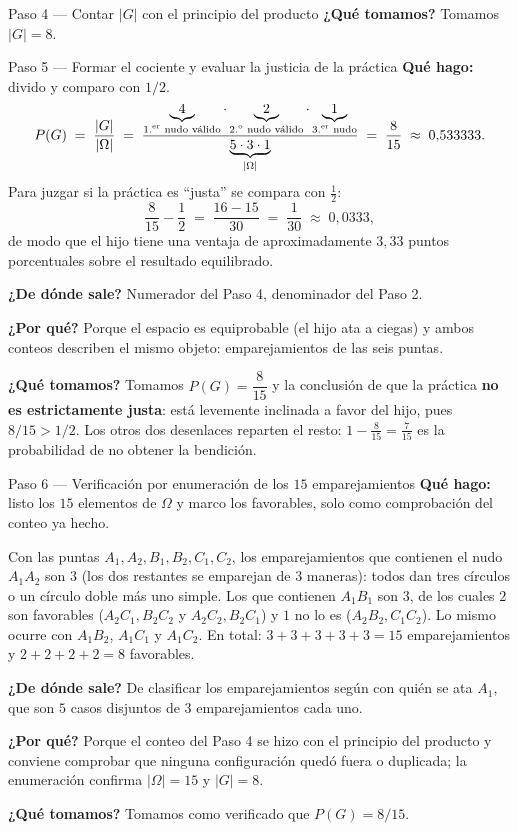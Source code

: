 \documentclass[11pt]{article}
\begin{document}
\begin{sol}
\begin{paso}{Paso 4 --- Contar $|G|$ con el principio del producto}
\textbf{¿Qu\'e tomamos?} Tomamos $|G|=8$.
\end{paso}

\begin{paso}{Paso 5 --- Formar el cociente y evaluar la justicia de la pr\'actica}
\textbf{Qu\'e hago:} divido y comparo con $1/2$.
\[
P(G)\;=\;\frac{|G|}{|\Omega|}
\;=\;\frac{\underbrace{4}_{\text{1.\textsuperscript{er} nudo v\'alido}}\cdot\underbrace{2}_{\text{2.\textsuperscript{o} nudo v\'alido}}\cdot\underbrace{1}_{\text{3.\textsuperscript{er} nudo}}}{\underbrace{5\cdot 3\cdot 1}_{|\Omega|}}
\;=\;\frac{8}{15}\;\approx\;0{,}533333 .
\]
Para juzgar si la pr\'actica es ``justa'' se compara con $\tfrac12$:
\[
\frac{8}{15}-\frac{1}{2}\;=\;\frac{16-15}{30}\;=\;\frac{1}{30}\;\approx\;0{,}0333 ,
\]
de modo que el hijo tiene una ventaja de aproximadamente $3{,}33$ puntos porcentuales sobre el resultado equilibrado.

\textbf{¿De d\'onde sale?} Numerador del Paso 4, denominador del Paso 2.

\textbf{¿Por qu\'e?} Porque el espacio es equiprobable (el hijo ata a ciegas) y ambos conteos describen el mismo objeto: emparejamientos de las seis puntas.

\textbf{¿Qu\'e tomamos?} Tomamos $P(G)=\dfrac{8}{15}$ y la conclusi\'on de que la pr\'actica \textbf{no es estrictamente justa}: est\'a levemente inclinada a favor del hijo, pues $8/15>1/2$. Los otros dos desenlaces reparten el resto: $1-\tfrac{8}{15}=\tfrac{7}{15}$ es la probabilidad de no obtener la bendici\'on.
\end{paso}

\begin{paso}{Paso 6 --- Verificaci\'on por enumeraci\'on de los $15$ emparejamientos}
\textbf{Qu\'e hago:} listo los $15$ elementos de $\Omega$ y marco los favorables, solo como comprobaci\'on del conteo ya hecho.

Con las puntas $A_1,A_2,B_1,B_2,C_1,C_2$, los emparejamientos que contienen el nudo $A_1A_2$ son $3$ (los dos restantes se emparejan de $3$ maneras): todos dan tres c\'irculos o un c\'irculo doble m\'as uno simple. Los que contienen $A_1B_1$ son $3$, de los cuales $2$ son favorables ($A_2C_1,B_2C_2$ y $A_2C_2,B_2C_1$) y $1$ no lo es ($A_2B_2,C_1C_2$). Lo mismo ocurre con $A_1B_2$, $A_1C_1$ y $A_1C_2$. En total: $3+3+3+3+3=15$ emparejamientos y $2+2+2+2=8$ favorables.

\textbf{¿De d\'onde sale?} De clasificar los emparejamientos seg\'un con qui\'en se ata $A_1$, que son $5$ casos disjuntos de $3$ emparejamientos cada uno.

\textbf{¿Por qu\'e?} Porque el conteo del Paso 4 se hizo con el principio del producto y conviene comprobar que ninguna configuraci\'on qued\'o fuera o duplicada; la enumeraci\'on confirma $|\Omega|=15$ y $|G|=8$.

\textbf{¿Qu\'e tomamos?} Tomamos como verificado que $P(G)=8/15$.
\end{paso}

\end{sol}
\end{document}
